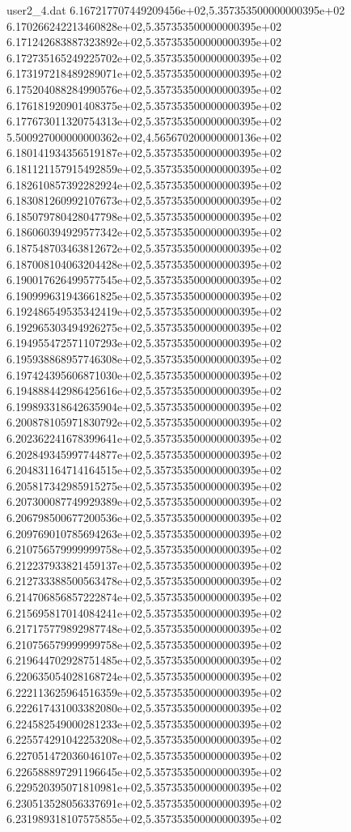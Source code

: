 \begin{filecontents}{user2_4.dat}
6.167217707449209456e+02,5.357353500000000395e+02
6.170266242213460828e+02,5.357353500000000395e+02
6.171242683887323892e+02,5.357353500000000395e+02
6.172735165249225702e+02,5.357353500000000395e+02
6.173197218489289071e+02,5.357353500000000395e+02
6.175204088284990576e+02,5.357353500000000395e+02
6.176181920901408375e+02,5.357353500000000395e+02
6.177673011320754313e+02,5.357353500000000395e+02
5.500927000000000362e+02,4.565670200000000136e+02
6.180141934356519187e+02,5.357353500000000395e+02
6.181121157915492859e+02,5.357353500000000395e+02
6.182610857392282924e+02,5.357353500000000395e+02
6.183081260992107673e+02,5.357353500000000395e+02
6.185079780428047798e+02,5.357353500000000395e+02
6.186060394929577342e+02,5.357353500000000395e+02
6.187548703463812672e+02,5.357353500000000395e+02
6.187008104063204428e+02,5.357353500000000395e+02
6.190017626499577545e+02,5.357353500000000395e+02
6.190999631943661825e+02,5.357353500000000395e+02
6.192486549535342419e+02,5.357353500000000395e+02
6.192965303494926275e+02,5.357353500000000395e+02
6.194955472571107293e+02,5.357353500000000395e+02
6.195938868957746308e+02,5.357353500000000395e+02
6.197424395606871030e+02,5.357353500000000395e+02
6.194888442986425616e+02,5.357353500000000395e+02
6.199893318642635904e+02,5.357353500000000395e+02
6.200878105971830792e+02,5.357353500000000395e+02
6.202362241678399641e+02,5.357353500000000395e+02
6.202849345997744877e+02,5.357353500000000395e+02
6.204831164714164515e+02,5.357353500000000395e+02
6.205817342985915275e+02,5.357353500000000395e+02
6.207300087749929389e+02,5.357353500000000395e+02
6.206798500677200536e+02,5.357353500000000395e+02
6.209769010785694263e+02,5.357353500000000395e+02
6.210756579999999758e+02,5.357353500000000395e+02
6.212237933821459137e+02,5.357353500000000395e+02
6.212733388500563478e+02,5.357353500000000395e+02
6.214706856857222874e+02,5.357353500000000395e+02
6.215695817014084241e+02,5.357353500000000395e+02
6.217175779892987748e+02,5.357353500000000395e+02
6.210756579999999758e+02,5.357353500000000395e+02
6.219644702928751485e+02,5.357353500000000395e+02
6.220635054028168724e+02,5.357353500000000395e+02
6.222113625964516359e+02,5.357353500000000395e+02
6.222617431003382080e+02,5.357353500000000395e+02
6.224582549000281233e+02,5.357353500000000395e+02
6.225574291042253208e+02,5.357353500000000395e+02
6.227051472036046107e+02,5.357353500000000395e+02
6.226588897291196645e+02,5.357353500000000395e+02
6.229520395071810981e+02,5.357353500000000395e+02
6.230513528056337691e+02,5.357353500000000395e+02
6.231989318107575855e+02,5.357353500000000395e+02

\end{filecontents}
